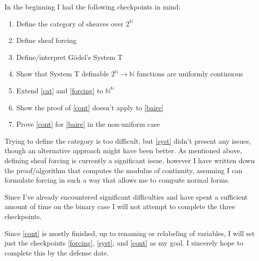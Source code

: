\documentclass{article}
\begin{document}
In the beginning I had the following checkpoints in mind:
\begin{enumerate}[(1)]
	\item\label{cat} Define the category of sheaves over $2^ℕ$
	\item\label{forcing} Define sheaf forcing
	\item\label{syst} Define/interpret Gödel's System T
	\item\label{cont} Show that System T definable $2^ℕ → ℕ$ functions are uniformly continuous
	\item\label{baire} Extend \ref{cat} and \ref{forcing} to $ℕ^ℕ$
	\item Show the proof of \ref{cont} doesn't apply to \ref{baire}
	\item Prove \ref{cont} for \ref{baire} in the non-uniform case
\end{enumerate}

Trying to define the category is too difficult, but \ref{syst} didn't present
any issues, though an alternative approach might have been better. As mentioned
above, defining sheaf forcing is currently a significant issue, however I have
written down the proof/algorithm that computes the modulus of continuity,
assuming I can formulate forcing in such a way that allows me to compute normal
forms.

Since I've already encountered significant difficulties and have spent a
sufficient amount of time on the binary case I will not attempt to complete
the three checkpoints.

Since \ref{cont} is mostly finished, up to renaming or relabeling of variables,
I will set just the checkpoints \ref{forcing}, \ref{syst}, and \ref{cont} as my
goal. I sincerely hope to complete this by the defense date.

\printbibliography
\end{document}
